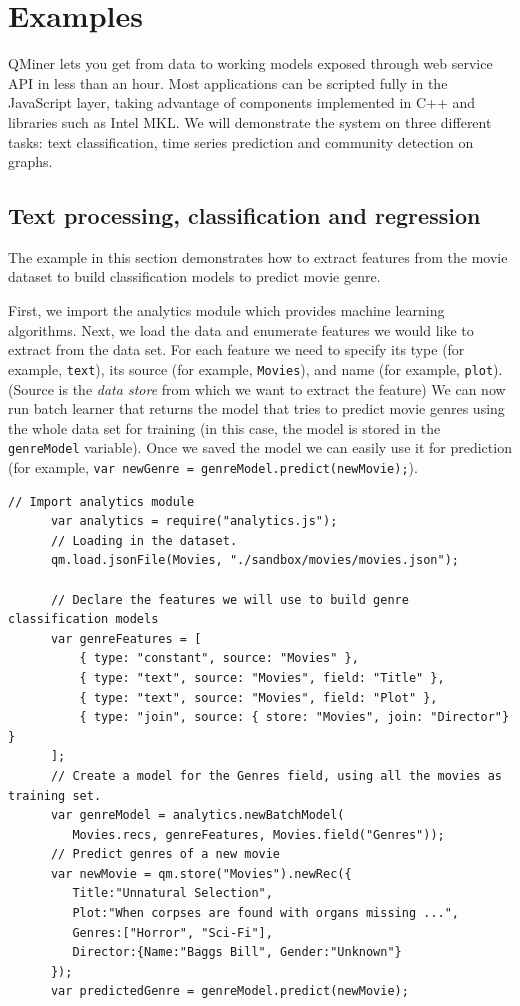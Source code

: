 \documentclass{article} %
\begin{document}
\section{Examples}

QMiner lets you get from data to working models exposed through web service API in less than an hour. Most applications can be scripted fully in the JavaScript layer, taking advantage of components implemented in C++ and libraries such as Intel MKL. We will demonstrate the system on three different tasks: text classification, time series prediction and community detection on graphs.

\subsection{Text processing, classification and regression}

The example in this section demonstrates how to extract features from the movie dataset to build classification models to predict movie genre.

First, we import the analytics module which provides machine learning algorithms. Next, we load the data and enumerate features we would like to extract from the data set. For each feature we need to specify its type (for example, \texttt{text}), its source (for example, \texttt{Movies}), and name (for example, \texttt{plot}). (Source is the \emph{data store} from which we want to extract the feature) We can now run batch learner that returns the model that tries to predict movie genres using the whole data set for training (in this case, the model is stored in the \texttt{genreModel} variable). Once we saved the model we can easily use it for prediction (for example, \texttt{var newGenre = genreModel.predict(newMovie);}).

      \begin{lstlisting}[caption={Text mining: storage, feature extraction and classification.}] 	
      // Import analytics module
      var analytics = require("analytics.js");
      // Loading in the dataset.
      qm.load.jsonFile(Movies, "./sandbox/movies/movies.json");
       	
      // Declare the features we will use to build genre classification models
      var genreFeatures = [
          { type: "constant", source: "Movies" },
          { type: "text", source: "Movies", field: "Title" },
          { type: "text", source: "Movies", field: "Plot" },
          { type: "join", source: { store: "Movies", join: "Director"} }
      ];
      // Create a model for the Genres field, using all the movies as training set.
      var genreModel = analytics.newBatchModel(
         Movies.recs, genreFeatures, Movies.field("Genres"));
      // Predict genres of a new movie
      var newMovie = qm.store("Movies").newRec({
         Title:"Unnatural Selection",
         Plot:"When corpses are found with organs missing ...",
         Genres:["Horror", "Sci-Fi"],
         Director:{Name:"Baggs Bill", Gender:"Unknown"}
      });
      var predictedGenre = genreModel.predict(newMovie);
      \end{lstlisting}
\end{document}
